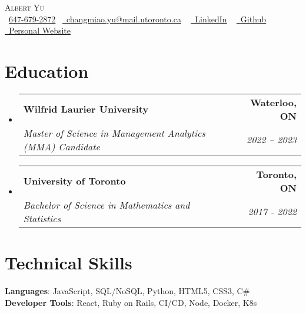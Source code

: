 \documentclass[letterpaper,11pt]{article}
\makeatletter
\newcommand{\resumeSubheading}[4]{
  \vspace{-2pt}\item
    \begin{tabular*}{1.0\textwidth}[t]{l@{\extracolsep{\fill}}r}
      \textbf{#1} & \textbf{\small #2} \\
      \textit{\small#3} & \textit{\small #4} \\
    \end{tabular*}\vspace{-7pt}
}
\newcommand{\resumeSubHeadingListStart}{\begin{itemize}[leftmargin=0.0in, label={}]}
\newcommand{\resumeSubHeadingListEnd}{\end{itemize}}
\makeatother
\begin{document}
\begin{center}
    {\Huge \scshape Albert Yu} \\ \vspace{1pt}
    \small \raisebox{-0.1\height}\faPhone\ \underline{647-679-2872}~ \href{changmiao.yu@mail.utoronto.ca}{\raisebox{-0.2\height}\faEnvelope\  \underline{changmiao.yu@mail.utoronto.ca}} ~ 
    \href{www.linkedin.com/in/albert-changmiao-yu}{\raisebox{-0.2\height}\faLinkedin\ \underline{LinkedIn}}  ~
    \href{https://github.com/AlbertYu97}{\raisebox{-0.2\height}\faGithub\ \underline{Github}}
    \href{https://albertyu97.github.io/Albert_Website_Design/}{\ \underline{Personal Website}}
    \vspace{-8pt}
\end{center}


\section{Education}
  \resumeSubHeadingListStart
    \resumeSubheading
      {Wilfrid Laurier University}{Waterloo, ON}
      {Master of Science in Management Analytics (MMA) Candidate}{2022 – 2023}
    \resumeSubheading
      {University of Toronto}{Toronto, ON}
      {Bachelor of Science in Mathematics and Statistics}{2017 - 2022}

  \resumeSubHeadingListEnd

  

%
\section{Technical Skills}
  \begin{itemize}[leftmargin=0.15in, label={}]
    \small{\item{
      \textbf{Languages}{: JavaScript, SQL/NoSQL, Python, HTML5, CSS3, C\#} \\
      \textbf{Developer Tools}{: React, Ruby on Rails, CI/CD, Node, Docker, K8s} \\
    }}
  \end{itemize}
\vspace{-16pt}

\end{document}
